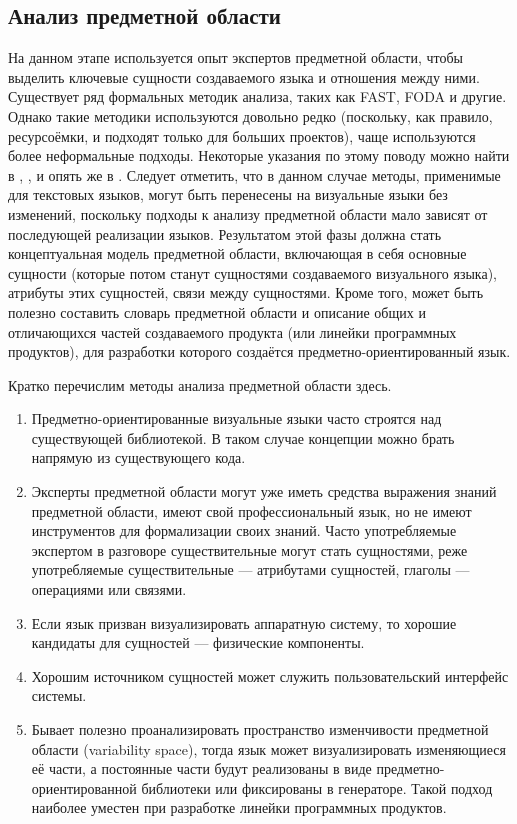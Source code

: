 \subsection{Анализ предметной области}
\label{chapterDomainAnalysis}
На данном этапе используется опыт экспертов предметной области, чтобы выделить ключевые 
сущности создаваемого языка и отношения между ними. Существует ряд формальных методик 
анализа, таких как FAST, FODA
 и другие. Однако такие методики используются довольно 
редко (поскольку, как правило, ресурсоёмки, и подходят только для больших проектов), 
чаще используются более неформальные подходы. Некоторые указания по этому поводу можно 
найти в \cite{mernik2005and}, \cite{voelter2009best}, \cite{luoma2004defining} и опять 
же в \cite{kelly2008domain}. Следует отметить, что в данном случае методы, применимые 
для текстовых языков, могут быть перенесены на визуальные языки без изменений, поскольку 
подходы к анализу предметной области мало зависят от последующей реализации языков. 
Результатом этой фазы должна стать концептуальная модель предметной области, включающая 
в себя основные сущности (которые потом станут сущностями создаваемого визуального языка), 
атрибуты этих сущностей, связи между сущностями. Кроме того, может быть полезно составить 
словарь предметной области и описание общих и отличающихся частей создаваемого продукта 
(или линейки программных продуктов), для разработки которого создаётся предметно-ориентированный 
язык.

Кратко перечислим методы анализа предметной области здесь.
\begin{enumerate}
	\item Предметно-ориентированные визуальные языки часто строятся над существующей 
		библиотекой. В таком случае концепции можно брать напрямую из существующего кода.
	\item Эксперты предметной области могут уже иметь средства выражения знаний предметной 
		области, имеют свой профессиональный язык, но не имеют инструментов для формализации 
		своих знаний. Часто употребляемые экспертом в разговоре существительные могут 
		стать сущностями, реже употребляемые существительные --- атрибутами сущностей, 
		глаголы --- операциями или связями. 
	\item Если язык призван визуализировать аппаратную систему, то хорошие кандидаты 
		для сущностей --- физические компоненты.
	\item Хорошим источником сущностей может служить пользовательский интерфейс системы.
	\item Бывает полезно проанализировать пространство изменчивости предметной области 
		(variability space), тогда язык может визуализировать изменяющиеся её части, а 
		постоянные части будут реализованы в виде предметно-ориентированной библиотеки
		или фиксированы в генераторе. Такой подход наиболее уместен при разработке линейки 
		программных продуктов.
\end{enumerate}

